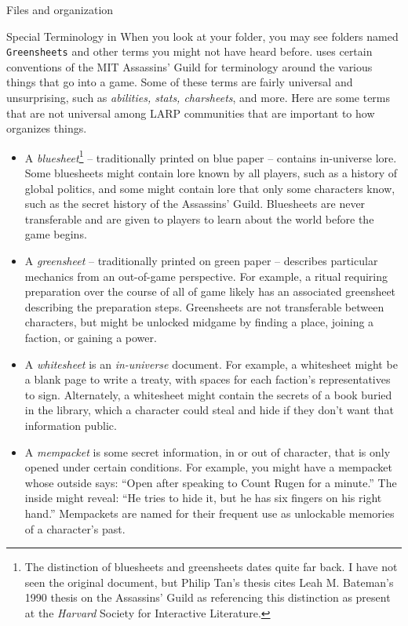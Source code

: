 \documentclass[sheet]{GameTexBase}
\begin{document}
\begin{section}{Files and organization}
\begin{subsection}{Special Terminology in \gametex{}}
When you look at your \gametex{} folder, you may see folders named \texttt{Greensheets} and other terms you might not have heard before.  \gametex{} uses certain conventions of the MIT Assassins' Guild for terminology around the various things that go into a game.  Some of these terms are fairly universal and unsurprising, such as \textit{abilities, stats, charsheets}, and more.  Here are some terms that are not universal among LARP communities that are important to how \gametex{} organizes things.
\begin{itemize}
    \item A \textit{bluesheet}\footnote{The distinction of bluesheets and greensheets dates quite far back.  I have not seen the original document, but Philip Tan's thesis cites Leah M. Bateman's 1990 thesis on the Assassins' Guild as referencing this distinction as present at the \emph{Harvard} Society for Interactive Literature.} -- traditionally printed on blue paper -- contains in-universe lore.  Some bluesheets might contain lore known by all players, such as a history of global politics, and some might contain lore that only some characters know, such as the secret history of the Assassins' Guild.  Bluesheets are never transferable and are given to players to learn about the world before the game begins.
    \item A \textit{greensheet} -- traditionally printed on green paper -- describes particular mechanics from an out-of-game perspective.  For example, a ritual requiring preparation over the course of all of game likely has an associated greensheet describing the preparation steps.  Greensheets are not transferable between characters, but might be unlocked midgame by finding a place, joining a faction, or gaining a power.
    \item A \textit{whitesheet} is an \emph{in-universe} document.  For example, a whitesheet might be a blank page to write a treaty, with spaces for each faction's representatives to sign.  Alternately, a whitesheet might contain the secrets of a book buried in the library, which a character could steal and hide if they don't want that information public.
    \item A \textit{mempacket} is some secret information, in or out of character, that is only opened under certain conditions.  For example, you might have a mempacket whose outside says: ``Open after speaking to Count Rugen for a minute.'' The inside might reveal: ``He tries to hide it, but he has six fingers on his right hand.''  Mempackets are named for their frequent use as unlockable memories of a character's past.

\end{itemize}
\end{subsection}
\end{section}
\end{document}
